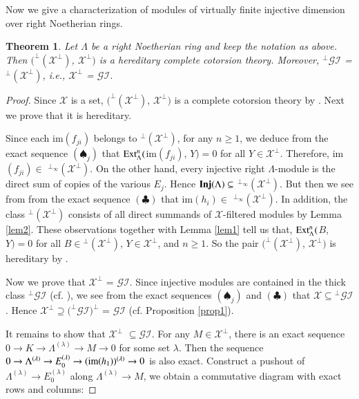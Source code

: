 \documentclass[11pt,a4paper]{article}
\newtheorem{thm}{Theorem}[section]
\begin{document}
Now  we give a characterization of modules of virtually finite injective dimension   over right
Noetherian rings.



\begin{thm}\label{thm1}  Let  $\Lambda$ be a right  Noetherian ring and keep the notation as above. Then
$(^\perp(\mathscr{X}^\perp)$, $\mathscr{X}^\perp)$ is a hereditary complete
  cotorsion theory. Moreover,  $^\perp\mathscr{GI}$ = $^\perp(\mathscr{X}^\perp)$, i.e.,
 $\mathscr{X}^\perp$ = $\mathscr{GI}$. \end{thm}

\begin{proof}
Since $\mathscr{X}$ is a set, $(^\perp(\mathscr{X}^\perp)$, $\mathscr{X}^\perp)$ is a   complete
  cotorsion theory by  \cite[Theorem 7.4.1]{eno5}. Next we prove that it is hereditary.

  Since  each im$(f_{ji})$ belongs to $^\perp(\mathscr{X}^\perp)$, for any $n \geq 1$, we deduce from the exact sequence $(\spadesuit_{j})$
that ${\rm Ext}_{\Lambda}^{n}($im$(f_{ji})$, $Y)=0$ for all $Y \in \mathscr{X}^\perp$. Therefore, im$(f_{ji}) \in$  $^{\perp_{\infty}}(\mathscr{X}^\perp)$.
On the other hand, every injective right  $\Lambda$-module is the direct sum
of copies of the various $E_{j}$. Hence   ${\bf Inj}(\Lambda) \subseteq $  $^{\perp_{\infty}}(\mathscr{X}^\perp)$.
But then we see from from the exact sequence $(\clubsuit)$
that  im$(h_{i}) \in$  $^{\perp_{\infty}}(\mathscr{X}^\perp)$.
   In addition, the class  $^\perp(\mathscr{X}^\perp)$ consists of all direct summands of $\mathscr{X}$-filtered modules by Lemma \ref{lem2}.
These observations  together with Lemma \ref{lem1} tell us that, ${\rm Ext}_{\Lambda}^{n}($$B$, $Y)=0$ for all $B \in {^\perp(\mathscr{X}^\perp)}$, $Y \in \mathscr{X}^\perp$,  and $n \geq 1$.
So the pair $(^\perp(\mathscr{X}^\perp)$, $\mathscr{X}^\perp)$   is hereditary by \cite[Lemma 5.24]{gbe}.

Now we prove that  $\mathscr{X}^\perp$ = $\mathscr{GI}$.
Since injective modules are contained in the thick class $^\perp\mathscr{GI}$ (cf. \cite[Lemma 5.24]{ss}), we see from the exact sequences $(\spadesuit_{j})$  and $(\clubsuit)$
that $\mathscr{X} \subseteq {^\perp\mathscr{GI}}$. Hence $\mathscr{X}^\perp \supseteq {(^\perp\mathscr{GI}})^\perp$ = $\mathscr{GI}$ (cf. Proposition \ref{prop1}).

It remains to show that $\mathscr{X}^\perp $   $\subseteq \mathscr{GI}$. For any $M \in \mathscr{X}^\perp $, there is an exact sequence
$0\rightarrow  K    \rightarrow \Lambda^{(\lambda)} \rightarrow  M\rightarrow 0   $  for some set $\lambda$. Then the sequence
$0\rightarrow  \Lambda^{(\lambda)}  \rightarrow E_{0}^{(\lambda)} \rightarrow {\rm(im(}h_{1}))^{(\lambda)}\rightarrow 0   $  is also exact.
 Construct a pushout of  $\Lambda^{(\lambda)}  \rightarrow E_{0}^{(\lambda)}$ along $\Lambda^{(\lambda)} \rightarrow  M$, we obtain a commutative diagram with exact
rows  and columns:



\end{proof}
\end{document}
